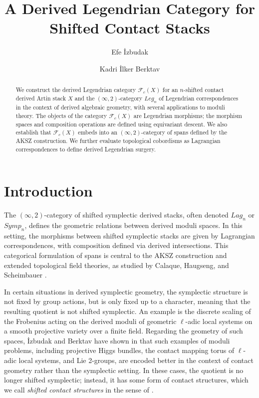 \documentclass[reqno]{amsart}
\begin{document}
\title{A Derived Legendrian Category for Shifted Contact Stacks}
\author{Efe \.{I}zbudak}
\address{Department of Mathematics, METU, 06800, Ankara, T\"urkiye}
\author{Kadri \.{I}lker Berktav}
\address{Department of Mathematics, METU, 06800, Ankara, T\"urkiye}

\begin{abstract}
We construct the derived Legendrian category $\mathcal{F}_{c}(X)$ for an $n$-shifted contact derived Artin stack $X$ and the $(\infty,2)$-category $Leg_n$ of Legendrian correspondences in the context of derived algebraic geometry, with several applications to moduli theory. The objects of the category $\mathcal{F}_{c}(X)$ are Legendrian morphisms; the morphism spaces and composition operations are defined using equivariant descent. We also establish that $\mathcal{F}_{c}(X)$ embeds into an $(\infty, 2)$-category of spans defined by the AKSZ construction. We further evaluate topological cobordisms as Lagrangian correspondences to define derived Legendrian surgery.
\end{abstract}
\maketitle
\tableofcontents

\section{Introduction}

The $(\infty, 2)$-category of shifted symplectic derived stacks, often denoted $Lag_n$ or $Symp_n$, defines the geometric relations between derived moduli spaces. In this setting, the morphisms between shifted symplectic stacks are given by Lagrangian correspondences, with composition defined via derived intersections. This categorical formulation of spans is central to the AKSZ construction and extended topological field theories, as studied by Calaque, Haugseng, and Scheimbauer \cite{CHS}.
\vspace{1in}

In certain situations in derived symplectic geometry, the symplectic structure is not fixed by group actions, but is only fixed up to a character, meaning that the resulting quotient is not shifted symplectic. An example is the discrete scaling of the Frobenius acting on the derived moduli of geometric $\ell$-adic local systems on a smooth projective variety over a finite field. Regarding the geometry of such spaces, \.{I}zbudak and Berktav have shown in \cite{IzbudakBerktav} that such examples of moduli problems, including projective Higgs bundles, the contact mapping torus of $\ell$-adic local systems, and Lie 2-groups, are encoded better in the context of contact geometry rather than the symplectic setting. In these cases, the quotient is no longer shifted symplectic; instead, it has some form of contact structures, which we call \textit{shifted contact structures} in the sense of \cite{Berktav1, Berktav2}. 
\end{document}
